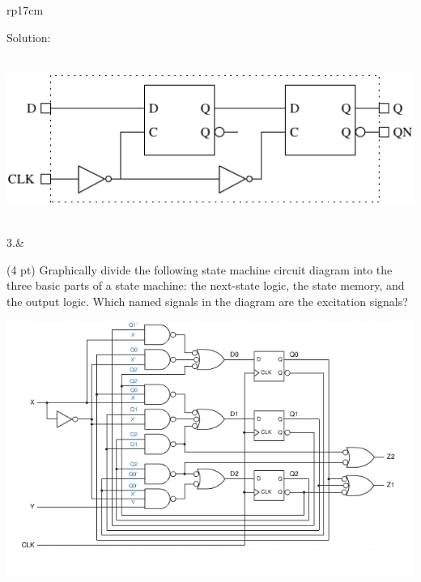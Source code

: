 \documentclass{article}
\begin{document}
\begin{longtable}[l]{rp{17cm}}
\begin{minipage}[t]{\linewidth}
Solution: \\ \\
\begin{center}
  \includegraphics{../LatchesAndFlipFlops/Assessments/DFlipFlopLogic}
\end{center}
\end{minipage}\\
\medskip
3.&\begin{minipage}[t]{\linewidth}(4 pt) Graphically divide the following state machine circuit diagram into the three basic parts of a state machine: the next-state logic, the state memory, and the output logic.  Which named signals in the diagram are the excitation signals?
\begin{center}
  \includegraphics[scale=0.7]{../StateMachines/Assessments/Wakerly_7_43}
\end{center}


\end{minipage}
\end{longtable}
\end{document}

